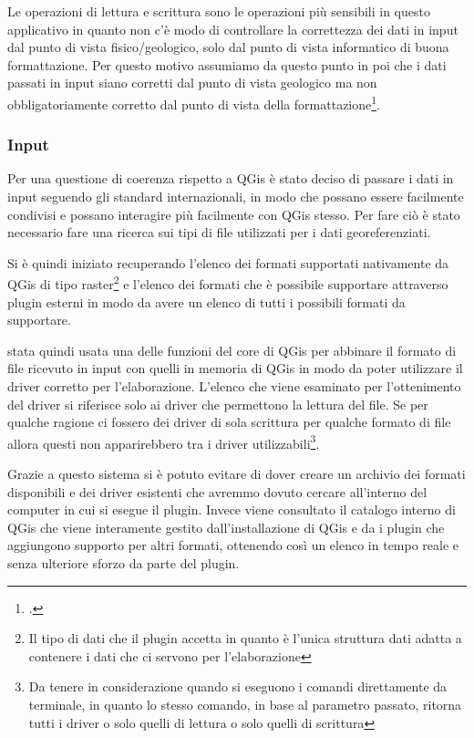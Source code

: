 Le operazioni di lettura e scrittura sono le operazioni più sensibili in questo applicativo in quanto non c'è modo di controllare la correttezza dei dati in input dal punto di vista fisico/geologico, solo dal punto di vista informatico di buona formattazione.
Per questo motivo assumiamo da questo punto in poi che i dati passati in input siano corretti dal punto di vista geologico ma non obbligatoriamente corretto dal punto di vista della formattazione\footcite{Il controllo del formato del file viene fatto in modo automatico quando il plugin cerca di caricare i file passati per indirizzo}.

\subsubsection{Input}
Per una questione di coerenza rispetto a QGis è stato deciso di passare i dati in input seguendo gli standard internazionali, in modo che possano essere facilmente condivisi e possano interagire più facilmente con QGis stesso. Per fare ciò è stato necessario fare una ricerca sui tipi di file utilizzati per i dati georeferenziati.

Si è quindi iniziato recuperando l'elenco dei formati supportati nativamente da QGis di tipo raster\footnote{Il tipo di dati che il plugin accetta in quanto è l'unica struttura dati adatta a contenere i dati che ci servono per l'elaborazione} e l'elenco dei formati che è possibile supportare attraverso plugin esterni in modo da avere un elenco di tutti i possibili formati da supportare.

\egrave stata quindi usata una delle funzioni del core di QGis per abbinare il formato di file ricevuto in input con quelli in memoria di QGis in modo da poter utilizzare il driver corretto per l'elaborazione. L'elenco che viene esaminato per l'ottenimento del driver si riferisce solo ai driver che permettono la lettura del file. Se per qualche ragione ci fossero dei driver di sola scrittura per qualche formato di file allora questi non apparirebbero tra i driver utilizzabili\footnote{Da tenere in considerazione quando si eseguono i comandi direttamente da terminale, in quanto lo stesso comando, in base al parametro passato, ritorna tutti i driver o solo quelli di lettura o solo quelli di scrittura}.

Grazie a questo sistema si è potuto evitare di dover creare un archivio dei formati disponibili e dei driver esistenti che avremmo dovuto cercare all'interno del computer in cui si esegue il plugin. Invece viene consultato il catalogo interno di QGis che viene interamente gestito dall'installazione di QGis e da i plugin che aggiungono supporto per altri formati, ottenendo così un elenco in tempo reale e senza ulteriore sforzo da parte del plugin. 

